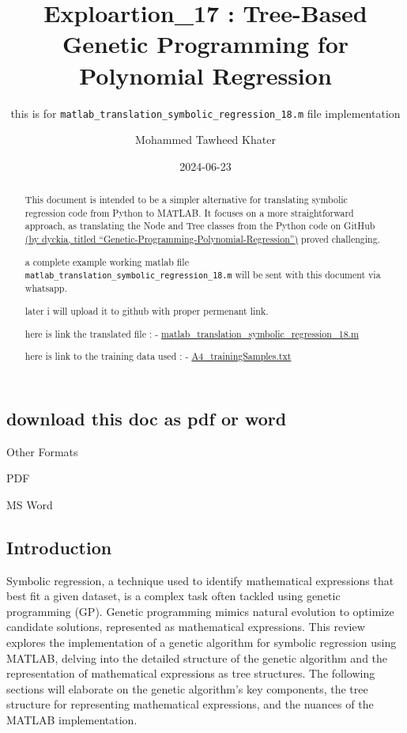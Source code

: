 \documentclass[
  letterpaper,
  DIV=11,
  numbers=noendperiod]{scrartcl}
\title{Exploartion\_17 : Tree-Based Genetic Programming for Polynomial
Regression}
\subtitle{this is for
\texttt{matlab\_translation\_symbolic\_regression\_18.m} file
implementation}
\author{Mohammed Tawheed Khater}
\date{2024-06-23}
\renewcommand*\contentsname{Table of contents}
\newcommand\contentsname{Table of contents}
\begin{document}
\maketitle
\begin{abstract}
This document is intended to be a simpler alternative for translating
symbolic regression code from Python to MATLAB. It focuses on a more
straightforward approach, as translating the Node and Tree classes from
the Python code on GitHub
\href{https://github.com/dyckia/Genetic-Programming-Polynomial-Regression}{(by
dyckia, titled ``Genetic-Programming-Polynomial-Regression'')} proved
challenging.

a complete example working matlab file
\texttt{matlab\_translation\_symbolic\_regression\_18.m} will be sent
with this document via whatsapp.

later i will upload it to github with proper permenant link.

here is link the translated file : -
\href{https://github.com/MohammedTwheed/dr-farid-genetic-programming-polynomial-regression-convert-to-matlab/blob/master/2024-06-22/SymboicRegression_02/matlab_translation_symbolic_regression_18.m}{matlab\_translation\_symbolic\_regression\_18.m}

here is link to the training data used : -
\href{https://github.com/MohammedTwheed/dr-farid-genetic-programming-polynomial-regression-convert-to-matlab/blob/master/A4_trainingSamples.txt}{A4\_trainingSamples.txt}
\end{abstract}

\renewcommand*\contentsname{Table of Contents}
{
\hypersetup{linkcolor=}
\setcounter{tocdepth}{3}
\tableofcontents
}
\subsection{download this doc as pdf or
word}\label{download-this-doc-as-pdf-or-word}

Other Formats

PDF

MS Word

\subsection{Introduction}\label{introduction}

Symbolic regression, a technique used to identify mathematical
expressions that best fit a given dataset, is a complex task often
tackled using genetic programming (GP). Genetic programming mimics
natural evolution to optimize candidate solutions, represented as
mathematical expressions. This review explores the implementation of a
genetic algorithm for symbolic regression using MATLAB, delving into the
detailed structure of the genetic algorithm and the representation of
mathematical expressions as tree structures. The following sections will
elaborate on the genetic algorithm's key components, the tree structure
for representing mathematical expressions, and the nuances of the MATLAB
implementation.
\end{document}
